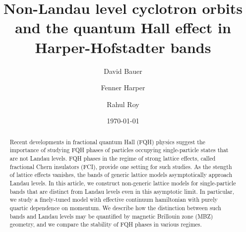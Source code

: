\documentclass[aps,prb,twocolumn,letterpaper,twoside,nobalancelastpage,groupedaddress,amsmath,amssymb,floatfix,citeautoscript]{revtex4-1}
\begin{document}
\def \Ns {\mathbb{N}}
\def \Rs {\mathbb{R}}
\def \Zs {\mathbb{Z}}
\def \Qs {\mathbb{Q}}
\def \Cs {\mathbb{C}}
\def \id {\mathbb{I}}

\def \bfq {{\bf q}}
\def \bfp {{\bf p}}
\def \bfx {{\bf x}}
\def \bfy {{\bf y}}
\def \bfz {{\bf z}}
\def \bfr {{\bf r}}
\def \bfk {{\bf k}}
\def \bfn {{\bf n}}
\def \bfb {{\bf b}}
\def \bfm {\mathbf{m}}
\def \bfn {\mathbf{n}}


\def \hatq {\widehat{q}}
\def \hatp {\widehat{p}}
\def \hata {\widehat{a}}
\def \hatadag {\widehat{a}^{\dagger}}
\def \wtN {\widetilde{N}}

\def \ve {\varepsilon}
\def \vth {\vartheta}

\title{Non-Landau level cyclotron orbits and the quantum Hall effect in Harper-Hofstadter bands}
\author{David Bauer}

\author{Fenner Harper}

\author{Rahul Roy}

\date{\today}
\begin{abstract}
Recent developments in fractional quantum Hall (FQH) physics suggest the importance of studying FQH phases of particles occupying single-particle states that are not Landau levels. FQH phases in the regime of strong lattice effects, called fractional Chern insulators (FCI), provide one setting for such studies. As the stength of lattice effects vanishes, the bands of generic lattice models asymptotically approach Landau levels. In this article, we construct non-generic lattice models for single-particle bands that are distinct from Landau levels even in this asymptotic limit. In particular, we study a finely-tuned model with effective continuum hamiltonian with purely quartic dependence on momentum. We describe how the distinction between such bands and Landau levels may be quantified by magnetic Brillouin zone (MBZ) geometry, and we compare the stability of FQH phases in various regimes.
\end{abstract}
\end{document}
